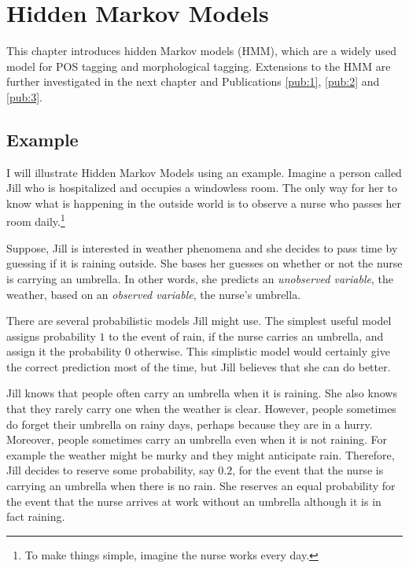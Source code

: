 \chapter{Hidden Markov Models}
\label{chapter:hmm}

This chapter introduces hidden Markov models (HMM), which are a widely
used model for POS tagging and morphological tagging. Extensions to
the HMM are further investigated in the next chapter and Publications
\ref{pub:1}, \ref{pub:2} and \ref{pub:3}.

\section{Example}

I will illustrate Hidden Markov Models using an example. Imagine a
person called Jill who is hospitalized and occupies a windowless
room. The only way for her to know what is happening in the outside
world is to observe a nurse who passes her room daily.\footnote{To make things simple, imagine the nurse works every day.}

Suppose, Jill is interested in weather phenomena and she decides to
pass time by guessing if it is raining outside. She bases her guesses
on whether or not the nurse is carrying an umbrella. In other words,
she predicts an {\it unobserved variable}, the weather, based on an
{\it observed variable}, the nurse's umbrella.

There are several probabilistic models Jill might use. The simplest
useful model assigns probability $1$ to the event of rain, if the
nurse carries an umbrella, and assign it the probability $0$
otherwise. This simplistic model would certainly give the correct
prediction most of the time, but Jill believes that she can do better.

Jill knows that people often carry an umbrella when it is raining. She
also knows that they rarely carry one when the weather is
clear. However, people sometimes do forget their umbrella on
rainy days, perhaps because they are in a hurry. Moreover, people
sometimes carry an umbrella even when it is not raining. For example
the weather might be murky and they might anticipate rain. Therefore,
Jill decides to reserve some probability, say $0.2$, for the event
that the nurse is carrying an umbrella when there is no rain. She
reserves an equal probability for the event that the nurse arrives at
work without an umbrella although it is in fact raining.
 
